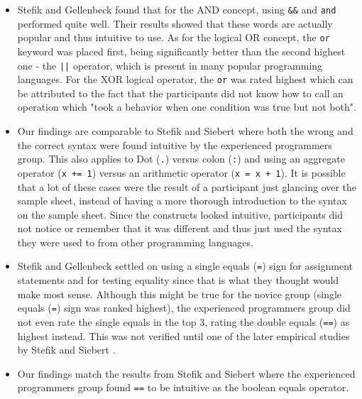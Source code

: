 \documentclass[10pt]{sigplanconf}
\begin{document}
\begin{itemize}
\item %
Stefik and Gellenbeck \cite{EmpStudiesonStimuli} found that for the AND concept, using \lstinline!&&! and \lstinline!and! performed quite well. Their results showed that these words are actually popular and thus intuitive to use. As for the logical OR concept, the \lstinline!or! keyword was placed first, being significantly better than the second highest one - the \lstinline!||! operator, which is present in many popular programming languages. For the XOR logical operator, the \lstinline!or! was rated highest which can be attributed to the fact that the participants did not know how to call an operation which "took a behavior when one condition was true but not both".

\item Our findings are comparable to Stefik and Siebert \cite{Empiricalinvestigation} where both the wrong and the correct syntax were found intuitive by the experienced programmers group. This also applies to Dot (\lstinline!.!) versus colon (\lstinline!:!) and using an aggregate operator (\lstinline!x += 1!) versus an arithmetic operator (\lstinline!x = x + 1!). It is possible that a lot of these cases were the result of a participant just glancing over the sample sheet, instead of having a more thorough introduction to the syntax on the sample sheet. Since the constructs looked intuitive, participants did not notice or remember that it was different and thus just used the syntax they were used to from other programming languages. 

\item Stefik and Gellenbeck \cite{EmpStudiesonStimuli} settled on using a single equals (\lstinline!=!) sign for assignment statements and for testing equality since that is what they thought would make most sense. Although this might be true for the novice group (single equals (\lstinline!=!) sign was ranked highest), the experienced programmers group did not even rate the single equals in the top 3, rating the double equals (\lstinline!==!) as highest instead. This was not verified until one of the later empirical studies by Stefik and Siebert \cite{Empiricalinvestigation}.

\item Our findings match the results from Stefik and Siebert \cite{Empiricalinvestigation} where the experienced programmers group found \lstinline!==! to be intuitive as the boolean equals operator.


\end{itemize}
\end{document}
